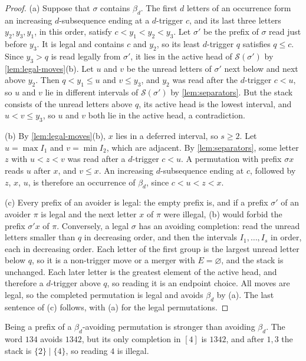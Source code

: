 \documentclass[11pt,reqno]{amsart}
\theoremstyle{definition}
\theoremstyle{remark}
\begin{document}
\begin{proof}
(a) Suppose that $\sigma$ contains $\beta_d$.  The first $d$ letters of an
occurrence form an increasing $d$-subsequence ending at a $d$-trigger $c$,
and its last three letters $y_2,y_3,y_1$, in this order, satisfy
$c<y_1<y_2<y_3$.  Let $\sigma'$ be the prefix of $\sigma$ read just
before $y_3$.  It is legal and contains $c$ and $y_2$, so its least
$d$-trigger $q$ satisfies $q\leq c$.  Since $y_3>q$ is read legally from
$\sigma'$, it lies in the active head of $\mathcal S(\sigma')$ by
\cref{lem:legal-moves}(b).  Let $u$ and $v$ be the unread letters of
$\sigma'$ next below and next above $y_2$.  Then $q<y_1\leq u$ and
$v\leq y_3$, and $y_2$ was read after the $d$-trigger $c<u$, so $u$ and $v$
lie in different intervals of $\mathcal S(\sigma')$ by \cref{lem:separators}.
But the stack consists of the unread letters above $q$, its active head is
the lowest interval, and $u<v\leq y_3$, so $u$ and $v$ both lie in the
active head, a contradiction.

(b) By \cref{lem:legal-moves}(b), $x$ lies in a deferred interval, so
$s\geq2$.  Let $u=\max I_1$ and $v=\min I_2$, which are adjacent.  By
\cref{lem:separators}, some letter $z$ with $u<z<v$ was read after a
$d$-trigger $c<u$.  A permutation with prefix $\sigma x$ reads $u$ after
$x$, and $v\leq x$.  An increasing $d$-subsequence ending at $c$, followed
by $z$, $x$, $u$, is therefore an occurrence of $\beta_d$, since
$c<u<z<x$.

(c) Every prefix of an avoider is legal: the empty prefix is, and if a
prefix $\sigma'$ of an avoider $\pi$ is legal and the next letter $x$ of
$\pi$ were illegal, (b) would forbid the prefix $\sigma'x$ of $\pi$.
Conversely, a legal $\sigma$ has an avoiding completion: read the unread
letters smaller than $q$ in decreasing order, and then the intervals
$I_1,\ldots,I_s$ in order, each in decreasing order.  Each letter of the
first group is the largest unread letter below $q$, so it is a non-trigger
move or a merger with $E=\varnothing$, and the stack is unchanged.  Each
later letter is the greatest element of the active head, and therefore a
$d$-trigger above $q$, so reading it is an endpoint choice.  All moves are
legal, so the completed permutation is legal and avoids $\beta_d$ by (a).
The last sentence of (c) follows, with (a) for the legal permutations.
\end{proof}

Being a prefix of a $\beta_d$-avoiding permutation is stronger than
avoiding $\beta_d$.  The word $134$ avoids $1342$, but its only completion in $[4]$
is $1342$, and after $1,3$ the stack is $\{2\}\mid\{4\}$, so reading
$4$ is illegal.
\end{document}
